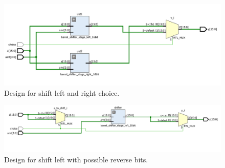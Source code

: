 \documentclass{article}\usepackage{graphicx} %
\begin{document}
\begin{figure}[H]
\begin{center}
	\caption{Design for shift left and right choice.}\label{fig:Left/Right}
	\includegraphics[width=1.0\textwidth]{../images/Shifters.png}
\end{center}
\end{figure}
\begin{figure}[H]
\begin{center}
	\caption{Design for shift left with possible reverse bits.}\label{fig:reverse/left}
	\includegraphics[width=1.0\textwidth]{../images/Shift_left_or_right.png}
\end{center}
\end{figure}
\end{document}
